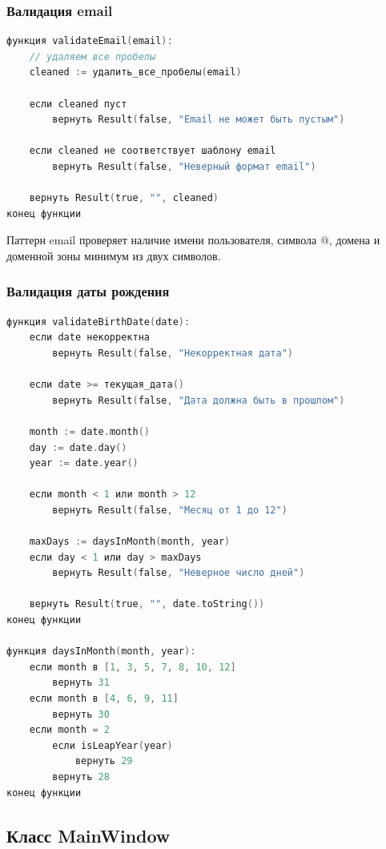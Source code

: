 \subsubsection*{Валидация email}

\begin{lstlisting}[language=C, caption=Функция validateEmail]
функция validateEmail(email):
    // удаляем все пробелы
    cleaned := удалить_все_пробелы(email)
    
    если cleaned пуст
        вернуть Result(false, "Email не может быть пустым")
    
    если cleaned не соответствует шаблону email
        вернуть Result(false, "Неверный формат email")
    
    вернуть Result(true, "", cleaned)
конец функции
\end{lstlisting}

Паттерн email проверяет наличие имени пользователя, символа @, домена и доменной зоны минимум из двух символов.

\subsubsection*{Валидация даты рождения}

\begin{lstlisting}[language=C, caption=Функция validateBirthDate]
функция validateBirthDate(date):
    если date некорректна
        вернуть Result(false, "Некорректная дата")
    
    если date >= текущая_дата()
        вернуть Result(false, "Дата должна быть в прошлом")
    
    month := date.month()
    day := date.day()
    year := date.year()
    
    если month < 1 или month > 12
        вернуть Result(false, "Месяц от 1 до 12")
    
    maxDays := daysInMonth(month, year)
    если day < 1 или day > maxDays
        вернуть Result(false, "Неверное число дней")
    
    вернуть Result(true, "", date.toString())
конец функции

функция daysInMonth(month, year):
    если month в [1, 3, 5, 7, 8, 10, 12]
        вернуть 31
    если month в [4, 6, 9, 11]
        вернуть 30
    если month = 2
        если isLeapYear(year)
            вернуть 29
        вернуть 28
конец функции
\end{lstlisting}

\subsection{Класс MainWindow}


